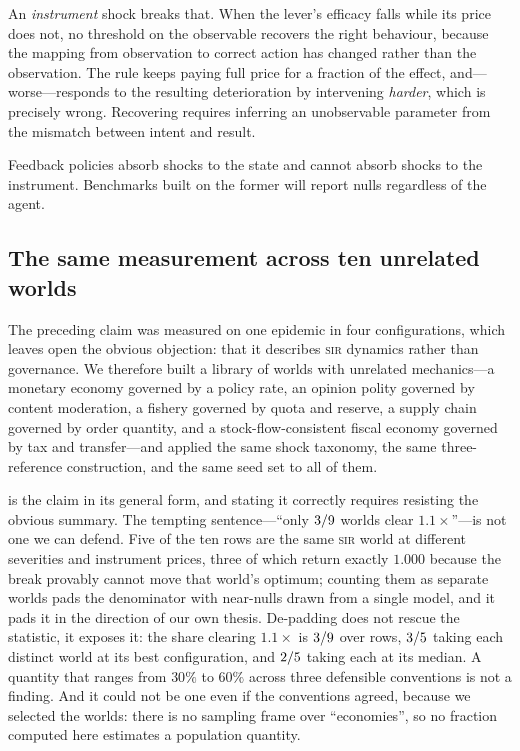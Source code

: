 \documentclass[11pt]{article}
\begin{document}
An \emph{instrument} shock breaks that. When the lever's efficacy falls while its price does not, no
threshold on the observable recovers the right behaviour, because the mapping from observation to
correct action has changed rather than the observation. The rule keeps paying full price for a
fraction of the effect, and---worse---responds to the resulting deterioration by intervening
\emph{harder}, which is precisely wrong. Recovering requires inferring an unobservable parameter
from the mismatch between intent and result.

\begin{takeaway}
Feedback policies absorb shocks to the state and cannot absorb shocks to the instrument. Benchmarks
built on the former will report nulls regardless of the agent.
\end{takeaway}

\subsection{The same measurement across ten unrelated worlds}
\label{sec:library}

The preceding claim was measured on one epidemic in four configurations, which leaves open the
obvious objection: that it describes \textsc{sir} dynamics rather than governance. We therefore built
a library of worlds with unrelated mechanics---a monetary economy governed by a policy rate, an
opinion polity governed by content moderation, a fishery governed by quota and reserve, a supply
chain governed by order quantity, and a stock-flow-consistent fiscal economy governed by tax and
transfer---and applied the same shock taxonomy, the same three-reference construction, and the same
seed set to all of them.



 is the claim in its general form, and stating it correctly requires resisting the
obvious summary. The tempting sentence---``only $3/9$ worlds clear $1.1\times$''---is not
one we can defend. Five of the ten rows are the same \textsc{sir} world at different severities and
instrument prices, three of which return exactly $1.000$ because the break provably cannot move that
world's optimum; counting them as separate worlds pads the denominator with near-nulls drawn from a
single model, and it pads it in the direction of our own thesis. De-padding does not rescue the
statistic, it exposes it: the share clearing $1.1\times$ is $3/9$ over rows, $3/5$
taking each distinct world at its best configuration, and $2/5$ taking each at its median.
A quantity that ranges from $30\%$ to $60\%$ across three defensible conventions is not a finding.
And it could not be one even if the conventions agreed, because we selected the worlds: there is no
sampling frame over ``economies'', so no fraction computed here estimates a population quantity.
\end{document}
